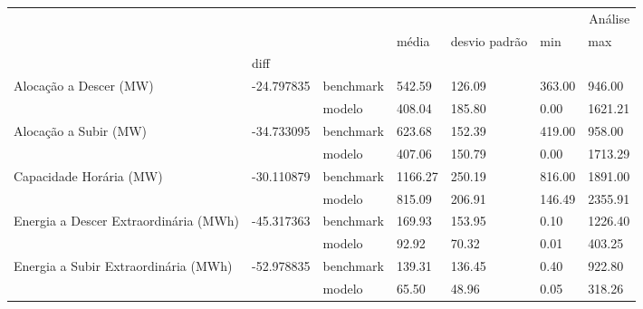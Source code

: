 \begin{tabular}{lllllll}
\toprule
 &  &  & \multicolumn{4}{r}{Análise} \\
 &  &  & média & desvio padrão & min & max \\
 & diff &  &  &  &  &  \\
\midrule
\multirow[t]{2}{*}{Alocação a Descer (MW)} & \multirow[t]{2}{*}{-24.797835} & benchmark & 542.59 & 126.09 & 363.00 & 946.00 \\
 &  & modelo & 408.04 & 185.80 & 0.00 & 1621.21 \\
\cline{1-7} \cline{2-7}
\multirow[t]{2}{*}{Alocação a Subir (MW)} & \multirow[t]{2}{*}{-34.733095} & benchmark & 623.68 & 152.39 & 419.00 & 958.00 \\
 &  & modelo & 407.06 & 150.79 & 0.00 & 1713.29 \\
\cline{1-7} \cline{2-7}
\multirow[t]{2}{*}{Capacidade Horária (MW)} & \multirow[t]{2}{*}{-30.110879} & benchmark & 1166.27 & 250.19 & 816.00 & 1891.00 \\
 &  & modelo & 815.09 & 206.91 & 146.49 & 2355.91 \\
\cline{1-7} \cline{2-7}
\multirow[t]{2}{*}{Energia a Descer Extraordinária (MWh)} & \multirow[t]{2}{*}{-45.317363} & benchmark & 169.93 & 153.95 & 0.10 & 1226.40 \\
 &  & modelo & 92.92 & 70.32 & 0.01 & 403.25 \\
\cline{1-7} \cline{2-7}
\multirow[t]{2}{*}{Energia a Subir Extraordinária (MWh)} & \multirow[t]{2}{*}{-52.978835} & benchmark & 139.31 & 136.45 & 0.40 & 922.80 \\
 &  & modelo & 65.50 & 48.96 & 0.05 & 318.26 \\
\cline{1-7} \cline{2-7}
\bottomrule
\end{tabular}
